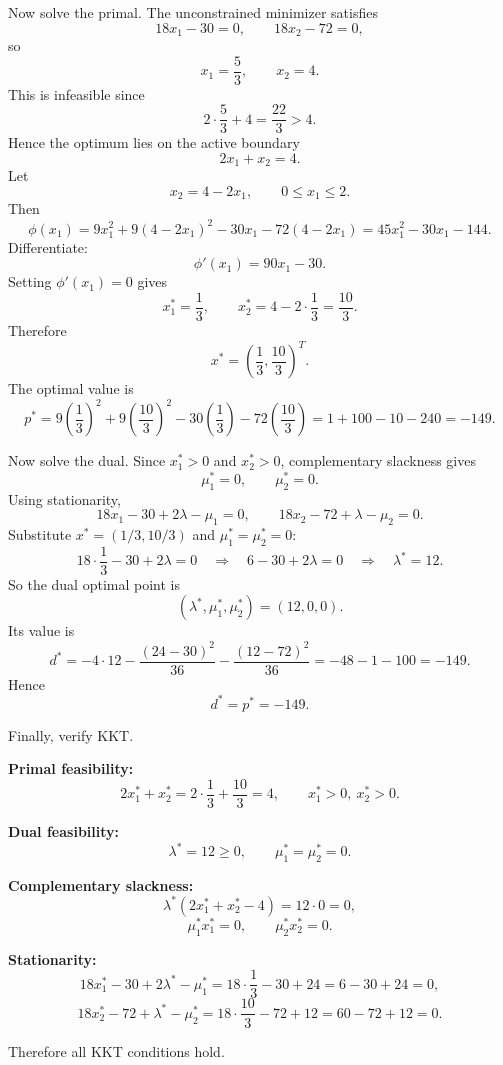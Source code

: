 \documentclass[11pt,letter,notitlepage]{article}
\theoremstyle{definition}
\begin{document}
\begin{solution}
\begin{enumerate}[label=(\alph*)]
Now solve the primal. The unconstrained minimizer satisfies
\[
18x_1-30=0,\qquad 18x_2-72=0,
\]
so
\[
x_1=\frac53,\qquad x_2=4.
\]
This is infeasible since
\[
2\cdot \frac53+4=\frac{22}{3}>4.
\]
Hence the optimum lies on the active boundary
\[
2x_1+x_2=4.
\]
Let
\[
x_2=4-2x_1,\qquad 0\le x_1\le 2.
\]
Then
\[
\phi(x_1)
=
9x_1^2+9(4-2x_1)^2-30x_1-72(4-2x_1)
=
45x_1^2-30x_1-144.
\]
Differentiate:
\[
\phi'(x_1)=90x_1-30.
\]
Setting \(\phi'(x_1)=0\) gives
\[
x_1^*=\frac13,
\qquad
x_2^*=4-2\cdot \frac13=\frac{10}{3}.
\]
Therefore
\[
x^*=\left(\frac13,\frac{10}{3}\right)^T.
\]
The optimal value is
\[
p^*
=
9\left(\frac13\right)^2+9\left(\frac{10}{3}\right)^2
-30\left(\frac13\right)-72\left(\frac{10}{3}\right)
=
1+100-10-240=-149.
\]

Now solve the dual. Since \(x_1^*>0\) and \(x_2^*>0\), complementary slackness gives
\[
\mu_1^*=0,\qquad \mu_2^*=0.
\]
Using stationarity,
\[
18x_1-30+2\lambda-\mu_1=0,
\qquad
18x_2-72+\lambda-\mu_2=0.
\]
Substitute \(x^*=(1/3,10/3)\) and \(\mu_1^*=\mu_2^*=0\):
\[
18\cdot \frac13-30+2\lambda=0
\quad\Longrightarrow\quad
6-30+2\lambda=0
\quad\Longrightarrow\quad
\lambda^*=12.
\]
So the dual optimal point is
\[
(\lambda^*,\mu_1^*,\mu_2^*)=(12,0,0).
\]
Its value is
\[
d^*
=
-4\cdot 12-\frac{(24-30)^2}{36}-\frac{(12-72)^2}{36}
=
-48-1-100=-149.
\]
Hence
\[
d^*=p^*=-149.
\]

Finally, verify KKT.

\textbf{Primal feasibility:}
\[
2x_1^*+x_2^*=2\cdot \frac13+\frac{10}{3}=4,\qquad x_1^*>0,\ x_2^*>0.
\]

\textbf{Dual feasibility:}
\[
\lambda^*=12\ge 0,\qquad \mu_1^*=\mu_2^*=0.
\]

\textbf{Complementary slackness:}
\[
\lambda^*(2x_1^*+x_2^*-4)=12\cdot 0=0,
\]
\[
\mu_1^*x_1^*=0,\qquad \mu_2^*x_2^*=0.
\]

\textbf{Stationarity:}
\[
18x_1^*-30+2\lambda^*-\mu_1^*
=
18\cdot \frac13-30+24
=
6-30+24=0,
\]
\[
18x_2^*-72+\lambda^*-\mu_2^*
=
18\cdot \frac{10}{3}-72+12
=
60-72+12=0.
\]

Therefore all KKT conditions hold.

\end{enumerate}

\end{solution}
\end{document}
